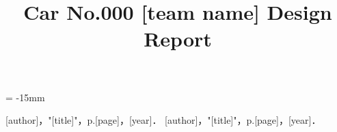 \documentclass[10pt]{jarticle}
\begin{document}
\footnotesize %




\date{\vspace{-15mm}}
\title{\vspace{-18mm} \small Car No.000 [team name] Design Report}

\oddsidemargin = -15mm
\maketitle %
\thispagestyle{empty}




\begin{multicols}{2} %
  










\begin{thebibliography}{99}
 [author]，"[title]"，p.[page]，[year]．
 [author]，"[title]"，p.[page]，[year]．
\end{thebibliography}

\end{multicols}


\end{document}
